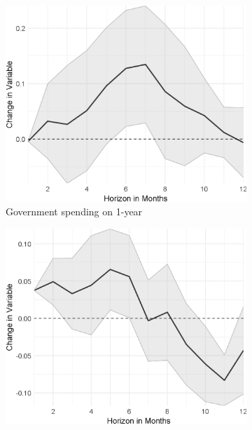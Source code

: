 
\begin{figure}[H]
	\centering
	\captionsetup{font=footnotesize}
	\begin{subfigure}{00.32\textwidth}
		\includegraphics[width=1\textwidth]{output/lp/baseline/bHP/government_spending/government_spendingonexpectations1y_djn.eps}
		\caption{Government spending on 1-year}
	\end{subfigure}
	\begin{subfigure}{00.32\textwidth}
		\includegraphics[width=1\textwidth]{output/lp/baseline/bHP/monetary_policy/monetary_policyonexpectations1y_djn.eps}

\end{subfigure}
\end{figure}
